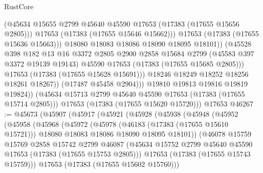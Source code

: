 \begin{lexlean}{RustCore}
\begin{coremodule}
                            (@45634
                              @15655
                              @2799
                              @45640
                              @45590
                              @17653
                              (@17383 (@17655 @15656 @2805)))
                            @17653
                            (@17383 (@17655 @15646 @15662)))
                          @17653
                          (@17383 (@17655 @15636 @15663)))
                        @18080
                        @18083
                        @18086
                        @18090
                        @18095
                        @18101))
                    (@45528
                      @398
                      @182
                      @13
                      @16
                      @3372
                      @2805
                      @2900
                      @2858
                      @15684
                      @2799
                      (@45583 @397 @3372 @19139 @19143)
                      @45590
                      @17653
                      (@17383 (@17655 @15685 @2805)))
                    @17653
                    (@17383 (@17655 @15628 @15691)))
                  @18246
                  @18249
                  @18252
                  @18256
                  @18261
                  @18267))
              (@17487 @45458 @2904)))
          @19810
          @19813
          @19816
          @19819
          @19824))
      (@45634 @15713 @2799 @45640 @45590 @17653 (@17383 (@17655 @15714 @2805)))
      @17653
      (@17383 (@17655 @15620 @15720)))
    @17653
@46267 := @45673
    (@45907
      (@45917
        (@45921
          (@45928
            (@45938
              (@45948
                (@45952
                  (@45958
                    (@45968
                      (@45972
                        (@45978
                          (@46183 (@17383 (@17655 @15610 @15721)))
                          @18080
                          @18083
                          @18086
                          @18090
                          @18095
                          @18101))
                      (@46078
                        @15759
                        @15769
                        @2858
                        @15742
                        @2799
                        @46087
                        (@45634 @15752 @2799 @45640 @45590 @17653 (@17383 (@17655 @15753 @2805)))
                        @17653
                        (@17383 (@17655 @15743 @15759)))
                      @17653
                      (@17383 (@17655 @15602 @15760)))

\end{coremodule}
\end{lexlean}
